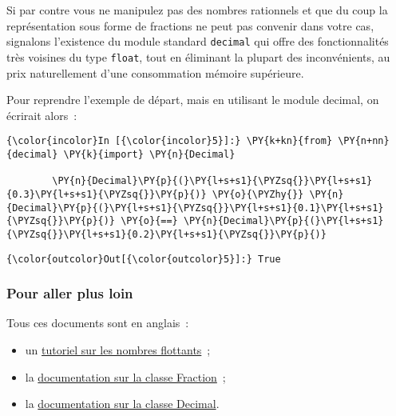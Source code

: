     Si par contre vous ne manipulez pas des nombres rationnels et que du
coup la représentation sous forme de fractions ne peut pas convenir dans
votre cas, signalons l'existence du module standard \texttt{decimal} qui
offre des fonctionnalités très voisines du type \texttt{float}, tout en
éliminant la plupart des inconvénients, au prix naturellement d'une
consommation mémoire supérieure.

    Pour reprendre l'exemple de départ, mais en utilisant le module decimal,
on écrirait alors~:

    \begin{Verbatim}[commandchars=\\\{\},frame=single,framerule=0.3mm,rulecolor=\color{cellframecolor}]
{\color{incolor}In [{\color{incolor}5}]:} \PY{k+kn}{from} \PY{n+nn}{decimal} \PY{k}{import} \PY{n}{Decimal}
        
        \PY{n}{Decimal}\PY{p}{(}\PY{l+s+s1}{\PYZsq{}}\PY{l+s+s1}{0.3}\PY{l+s+s1}{\PYZsq{}}\PY{p}{)} \PY{o}{\PYZhy{}} \PY{n}{Decimal}\PY{p}{(}\PY{l+s+s1}{\PYZsq{}}\PY{l+s+s1}{0.1}\PY{l+s+s1}{\PYZsq{}}\PY{p}{)} \PY{o}{==} \PY{n}{Decimal}\PY{p}{(}\PY{l+s+s1}{\PYZsq{}}\PY{l+s+s1}{0.2}\PY{l+s+s1}{\PYZsq{}}\PY{p}{)}
\end{Verbatim}


\begin{Verbatim}[commandchars=\\\{\},frame=single,framerule=0.3mm,rulecolor=\color{cellframecolor}]
{\color{outcolor}Out[{\color{outcolor}5}]:} True
\end{Verbatim}
            
    \hypertarget{pour-aller-plus-loin}{%
\subsubsection{Pour aller plus loin}\label{pour-aller-plus-loin}}

    Tous ces documents sont en anglais~:

\begin{itemize}
\tightlist
\item
  un
  \href{https://docs.python.org/3/tutorial/floatingpoint.html}{tutoriel
  sur les nombres flottants}~;
\item
  la
  \href{https://docs.python.org/3/library/fractions.html}{documentation
  sur la classe Fraction}~;
\item
  la \href{https://docs.python.org/3/library/decimal.html}{documentation
  sur la classe Decimal}.
\end{itemize}


    
    
    
